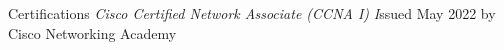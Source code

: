 \documentclass[
	10pt, %
]{resume} %
\begin{document}


\begin{rSection}{Certifications}
	\textit{Cisco Certified Network Associate (CCNA I)} \hfill \textit Issued May 2022 by Cisco Networking Academy
\end{rSection}






\end{document}
